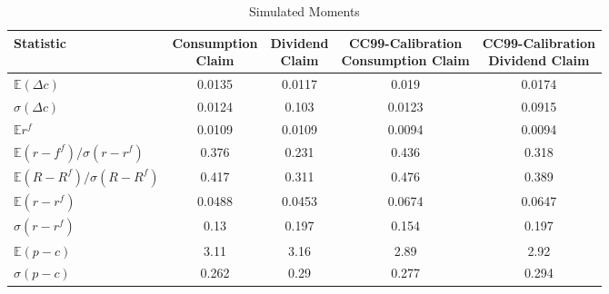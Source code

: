 \begin{table}[H]
\centering
\caption{Simulated Moments}
\label{tab:simmom}
\begin{tabular}{@{}lcccc@{}}
\toprule
Statistic                                               & \makecell{Consumption \\ Claim} & \makecell{Dividend \\ Claim} & \makecell{CC99-Calibration \\ Consumption Claim} & \makecell{CC99-Calibration\\ Dividend Claim} \\ \midrule
$\mathbb{E}\left(\Delta c \right)$                      &0.0135&0.0117&0.019&0.0174\\
$\sigma\left(\Delta c \right)$                          &0.0124&0.103&0.0123&0.0915\\
$\mathbb{E}r^f$                                         &0.0109&0.0109&0.0094&0.0094\\
$\mathbb{E}\left(r-f^f\right)/\sigma\left(r-r^f\right)$ &0.376&0.231& 0.436                                       &         0.318                            \\
$\mathbb{E}\left(R-R^f\right)/\sigma\left(R-R^f\right)$ & 0.417   & 0.311               &  0.476                                      &      0.389                               \\
$\mathbb{E}\left(r-r^f\right)$                          &  0.0488                 &      0.0453          &         0.0674                               &        0.0647                             \\
$\sigma\left(r-r^f\right)$                              &     0.13              &       0.197           &   0.154                                       &                  0.197                     \\
$\mathbb{E}\left(p-c\right)$                          &     3.11                &      3.16            &         2.89                                 &             2.92                          \\
$\sigma\left(p-c\right)$                              &       0.262            &      0.29          &   0.277                                     & 0.294                                    \\ \bottomrule
\end{tabular}
\end{table}
